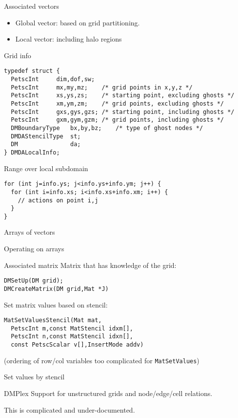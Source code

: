 \begin{numberedframe}{Associated vectors}
  \begin{itemize}
  \item Global vector: based on grid partitioning.
  \item Local vector: including halo regions
  \end{itemize}
\end{numberedframe}

\begin{numberedframe}{Grid info}
\begin{lstlisting}
typedef struct {
  PetscInt     dim,dof,sw;
  PetscInt     mx,my,mz;    /* grid points in x,y,z */
  PetscInt     xs,ys,zs;    /* starting point, excluding ghosts */
  PetscInt     xm,ym,zm;    /* grid points, excluding ghosts */
  PetscInt     gxs,gys,gzs; /* starting point, including ghosts */
  PetscInt     gxm,gym,gzm; /* grid points, including ghosts */
  DMBoundaryType   bx,by,bz;    /* type of ghost nodes */
  DMDAStencilType  st;
  DM               da;
} DMDALocalInfo;
\end{lstlisting}
\end{numberedframe}

\begin{numberedframe}{Range over local subdomain}
\begin{lstlisting}
for (int j=info.ys; j<info.ys+info.ym; j++) {
  for (int i=info.xs; i<info.xs+info.xm; i++) {
    // actions on point i,j
  }
}
\end{lstlisting}
\end{numberedframe}

\begin{numberedframe}{Arrays of vectors}
\end{numberedframe}

\begin{numberedframe}{Operating on arrays}
\end{numberedframe}

\begin{numberedframe}{Associated matrix}
Matrix that has knowledge of the grid:
\begin{lstlisting}
DMSetUp(DM grid);
DMCreateMatrix(DM grid,Mat *J)
\end{lstlisting}
Set matrix values based on stencil:
\begin{lstlisting}
MatSetValuesStencil(Mat mat,
  PetscInt m,const MatStencil idxm[],
  PetscInt n,const MatStencil idxn[],
  const PetscScalar v[],InsertMode addv)
\end{lstlisting}
(ordering of row/col variables too complicated for \lstinline{MatSetValues})
\end{numberedframe}

\begin{numberedframe}{Set values by stencil}
  \footnotesize
\end{numberedframe}

\begin{numberedframe}{DMPlex}
  Support for unstructured grids and node/edge/cell relations.

  This is complicated and under-documented.
\end{numberedframe}

